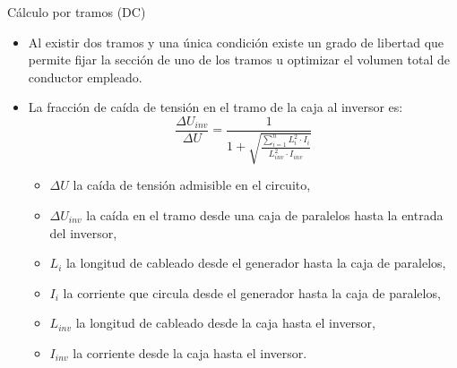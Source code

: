 \documentclass[aspectratio=169, usenames,svgnames,dvipsnames]{beamer}
\begin{document}
\begin{frame}[label={sec:org4dab282}]{Cálculo por tramos (DC)}
\begin{itemize}
\item Al existir dos tramos y una única condición existe un grado de libertad que permite fijar la sección de uno de los tramos u optimizar el volumen total de conductor empleado.

\item La fracción de caída de tensión en el tramo de la caja al inversor es:  
\begin{equation*}
  \frac{\Delta U_{inv}}{\Delta U}= \frac{1}{1+\sqrt{\frac{\sum_{i=1}^nL_{i}^2
        \cdot I_{i}}{L_{inv}^2 \cdot I_{inv}}}}
\end{equation*}

\begin{itemize}
\item \(\Delta U\) la caída de tensión admisible en el circuito,

\item \(\Delta U_{inv}\) la caída en el tramo desde una caja de paralelos hasta la entrada del inversor,

\item \(L_i\) la longitud de cableado desde el generador hasta la caja de paralelos,

\item \(I_i\) la corriente que circula desde el generador hasta la caja de paralelos,

\item \(L_{inv}\) la longitud de cableado desde la caja hasta el inversor,

\item \(I_{inv}\) la corriente desde la caja hasta el inversor.
\end{itemize}
\end{itemize}
\end{frame}
\end{document}
